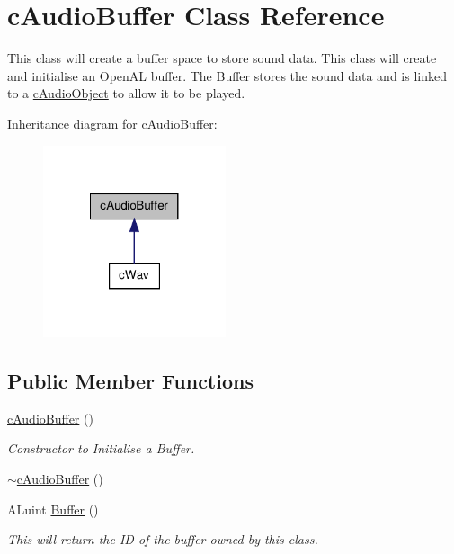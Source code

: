 \hypertarget{classc_audio_buffer}{
\section{cAudioBuffer Class Reference}
\label{classc_audio_buffer}
}


This class will create a buffer space to store sound data. This class will create and initialise an OpenAL buffer. The Buffer stores the sound data and is linked to a \hyperlink{classc_audio_object}{cAudioObject} to allow it to be played.  




Inheritance diagram for cAudioBuffer:
\nopagebreak
\begin{figure}[H]
\begin{center}
\leavevmode
\includegraphics[width=152pt]{classc_audio_buffer__inherit__graph}
\end{center}
\end{figure}
\subsection*{Public Member Functions}
\begin{DoxyCompactItemize}
\item 
\hyperlink{classc_audio_buffer_adae216a1c736e8474f8db45319f97467}{cAudioBuffer} ()
\begin{DoxyCompactList}\small\item\em Constructor to Initialise a Buffer. \item\end{DoxyCompactList}\item 
\hyperlink{classc_audio_buffer_a20e4551c956b32d6f6d9a65c299931f3}{$\sim$cAudioBuffer} ()
\item 
ALuint \hyperlink{classc_audio_buffer_a4fb260df2f23cf5c8ec4b557555df89b}{Buffer} ()
\begin{DoxyCompactList}\small\item\em This will return the ID of the buffer owned by this class. \item\end{DoxyCompactList}\end{DoxyCompactItemize}
